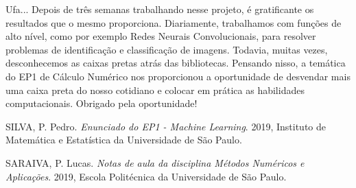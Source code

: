\documentclass[twocolumn,amsmath,amssymb,floatfix]{revtex4}
\begin{document}
Ufa... Depois de três semanas trabalhando nesse projeto, é gratificante os resultados que o mesmo proporciona. Diariamente, trabalhamos com funções de alto nível, como por exemplo Redes Neurais Convolucionais, para resolver problemas de identificação e classificação de imagens. Todavia, muitas vezes, desconhecemos as caixas pretas atrás das bibliotecas. Pensando nisso, a temática do EP1 de Cálculo Numérico nos proporcionou a oportunidade de desvendar mais uma caixa preta do nosso cotidiano e colocar em prática as habilidades computacionais.
Obrigado pela oportunidade! 

\begin{thebibliography}{1}

 SILVA, P. Pedro. {\em Enunciado do EP1 - Machine Learning}. 2019, Instituto de Matemática e Estatística da Universidade de São Paulo.

 SARAIVA, P. Lucas. {\em Notas de aula da disciplina Métodos Numéricos e Aplicações}. 2019, Escola Politécnica da Universidade de São Paulo.

\end{thebibliography}
\end{document}
